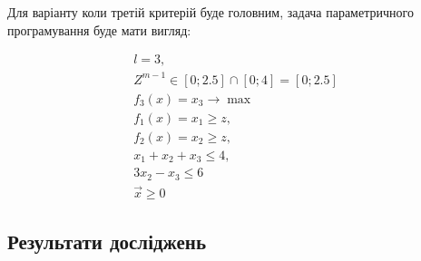 Для варіанту коли третій критерій буде головним, задача параметричного програмування буде мати вигляд:

\begin{gather*}
    l = 3, \\ 
    Z^{m-1} \in [0; 2.5] \cap [0; 4] = [0; 2.5] \\
    f_3 (x) = x_3 \to \max \\
    f_1 (x) = x_1 \geqslant z,  \\
    f_2 (x) = x_2 \geqslant z,  \\
    x_1 + x_2 + x_3 \leqslant 4, \\
    3 x_2 - x_3 \leqslant 6 \\
    \vec{x} \geqslant 0
\end{gather*}

\subsection{Результати досліджень}






